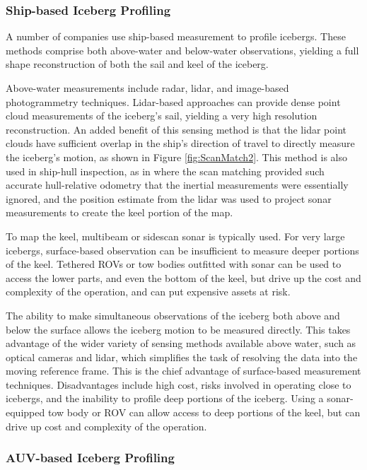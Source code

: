 \subsubsection{Ship-based Iceberg Profiling}

A number of companies use ship-based measurement to profile icebergs. These methods comprise both above-water and below-water observations, yielding a full shape reconstruction of both the sail and keel of the iceberg. 

Above-water measurements include radar, lidar, and image-based photogrammetry techniques. Lidar-based approaches can provide dense point cloud measurements of the iceberg's sail, yielding a very high resolution reconstruction. An added benefit of this sensing method is that the lidar point clouds have sufficient overlap in the ship's direction of travel to directly measure the iceberg's motion, as shown in Figure \ref{fig:ScanMatch2}. This method is also used in ship-hull inspection, as in \cite{Papadopoulos2014} where the scan matching provided such accurate hull-relative odometry that the inertial measurements were essentially ignored, and the position estimate from the lidar was used to project sonar measurements to create the keel portion of the map.

To map the keel, multibeam or sidescan sonar is typically used. For very large icebergs, surface-based observation can be insufficient to measure deeper portions of the keel. Tethered ROVs or tow bodies outfitted with sonar can be used to access the lower parts, and even the bottom of the keel, but drive up the cost and complexity of the operation, and can put expensive assets at risk. 

The ability to make simultaneous observations of the iceberg both above and below the surface allows the iceberg motion to be measured directly. This takes advantage of the wider variety of sensing methods available above water, such as optical cameras and lidar, which simplifies the task of resolving the data into the moving reference frame. This is the chief advantage of surface-based measurement techniques. Disadvantages include high cost, risks involved in operating close to icebergs, and the inability to profile deep portions of the iceberg. Using a sonar-equipped tow body or ROV can allow access to deep portions of the keel, but can drive up cost and complexity of the operation. 


\subsubsection{AUV-based Iceberg Profiling}

